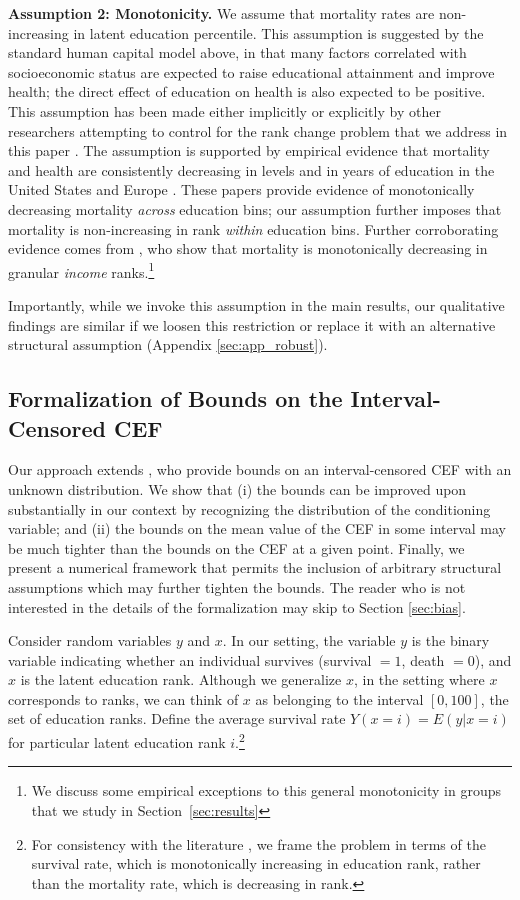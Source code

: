 \documentclass[12pt,letterpaper]{article}
\numberwithin{equation}{section}
\begin{document}
\textbf{Assumption 2: Monotonicity.} We assume that mortality rates are non-increasing in latent education percentile. This assumption is suggested by the standard human capital model above, in that many factors correlated with socioeconomic status are expected to raise educational attainment and improve health; the direct effect of education on health is also expected to be positive. This assumption has been made either implicitly or explicitly by other researchers attempting to control for the rank change problem that we address in this paper \citep{Cutler2011,Bound2015,Hendi2015,Goldring2016}. The assumption is supported by empirical evidence that mortality and health are consistently decreasing in levels and in years of education in the United States and Europe \citep{Pappas1993,Mackenbach2003,Meara2008,Cutler2010}. These papers provide evidence of monotonically decreasing mortality \textit{across} education bins; our assumption further imposes that mortality is non-increasing in rank \textit{within} education bins. Further corroborating evidence comes from \citet{chetty2016}, who show that mortality is monotonically decreasing in granular \textit{income} ranks.\footnote{We discuss some empirical exceptions to this general monotonicity in groups that we study in Section~\ref{sec:results}}

Importantly, while we invoke this assumption in the main results, our qualitative findings are similar if we loosen this restriction or replace it with an alternative structural assumption (Appendix \ref{sec:app_robust}).

\subsection{Formalization of Bounds on the Interval-Censored CEF}

Our approach extends \citet{Manski2002}, who provide bounds on an interval-censored CEF with an unknown distribution. We show that (i) the \citet{Manski2002} bounds can be improved upon substantially in our context by recognizing the distribution of the conditioning variable; and (ii) the bounds on the mean value of the CEF in some interval may be much tighter than the bounds on the CEF at a given point. Finally, we present a numerical framework that permits the inclusion of arbitrary structural assumptions which may further tighten the bounds. The reader who is not interested in the details of the formalization may skip to Section \ref{sec:bias}.

Consider random variables $y$ and $x$. In our setting, the variable $y$ is the binary variable
indicating whether an individual survives (survival $= 1$, death
$=0$), and $x$ is the latent education
rank. Although we generalize $x$, in the setting where $x$ corresponds to ranks, we can
think of $x$ as belonging to the interval $[0,100]$, the set of education ranks.
Define the average survival rate $Y(x=i) = E(y|x=i)$ for particular latent
education rank $i$.\footnote{For consistency with the literature
  \citep{Manski2002}, we frame the problem in terms of the survival
  rate, which is monotonically increasing in education rank, rather
  than the mortality rate, which is decreasing in rank.} 
\end{document}
